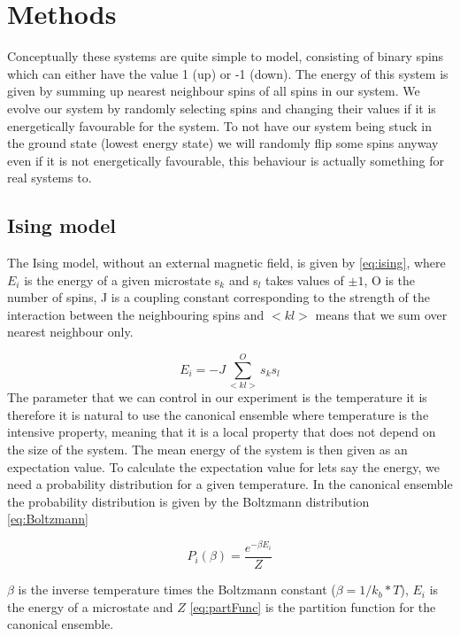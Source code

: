 \section{Methods}

Conceptually these systems are quite simple to model,
consisting of binary spins which can either have the value 1 (up) or -1 (down).
The energy of this system is given by summing up nearest neighbour spins of all
spins in our system. We evolve our system by randomly selecting spins and
changing their values if it is energetically favourable for the system. To not
have our system being stuck in the ground state (lowest energy state) we will randomly flip some spins
anyway even if it is not energetically favourable, this behaviour is actually
something for real systems to.
\subsection{Ising model}
The Ising model, without an external magnetic field, is given by
\cref{eq:ising}, where $E_i$ is the energy of a given microstate s$_k$ and s$_l$ takes values of $\pm 1$, O is the
number of spins, J is a coupling constant corresponding to the strength of the
interaction between the neighbouring spins and $<kl>$ means that we sum over
nearest neighbour only.

\begin{equation}\label{eq:ising}
  E_i = -J\sum_{<kl>}^{O} s_k s_l
\end{equation}
The parameter that we can control in our experiment is the temperature it is
therefore it is natural to
use the canonical ensemble where temperature is the intensive property, meaning
that it is a local property that does not depend on the size of the system. The
mean energy of the system is then given as an expectation value. To calculate
the expectation value for lets say the energy, we need a probability distribution
for a given temperature. In the canonical ensemble the probability distribution
is given by the Boltzmann distribution \cref{eq:Boltzmann}

\begin{equation}\label{eq:Boltzmann}
  P_i(\beta) = \frac{e^{-\beta E_i}}{Z}
\end{equation}

$\beta$ is the inverse temperature times the Boltzmann constant
($\beta = 1/k_b*T $),  $E_i$ is the energy of a microstate and $Z$
\cref{eq:partFunc} is the partition function for the canonical ensemble.

